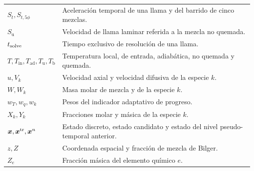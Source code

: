 \documentclass[12pt,a4paper,twoside,openany]{book}
\newcommand{\vect}[1]{\bm{#1}}
\newcommand{\Su}{S_{\mathrm{u}}}
\newcommand{\Tin}{T_{\mathrm{in}}}
\newcommand{\Tad}{T_{\mathrm{ad}}}
\begin{document}
\begin{longtable}{@{}p{}p{}@{}}
\(S_t,S_{t,5\phi}\) & Aceleración temporal de una llama y del barrido de cinco mezclas. \\
\(\Su\) & Velocidad de llama laminar referida a la mezcla no quemada. \\
\(t_{\rm solve}\) & Tiempo exclusivo de resolución de una llama. \\
\(T,\Tin,\Tad,T_{\mathrm u},T_{\mathrm b}\) & Temperatura local, de entrada, adiabática, no quemada y quemada. \\
\(u,V_k\) & Velocidad axial y velocidad difusiva de la especie \(k\). \\
\(W,W_k\) & Masa molar de mezcla y de la especie \(k\). \\
\(w_T,w_q,w_k\) & Pesos del indicador adaptativo de progreso. \\
\(X_k,Y_k\) & Fracciones molar y másica de la especie \(k\). \\
\(\vect x,\vect x^{\rm tr},\vect x^n\) & Estado discreto, estado candidato y estado del nivel pseudo-temporal anterior. \\
\(z,Z\) & Coordenada espacial y fracción de mezcla de Bilger. \\
\(Z_e\) & Fracción másica del elemento químico \(e\). \\
\bottomrule
\end{longtable}
\end{document}
